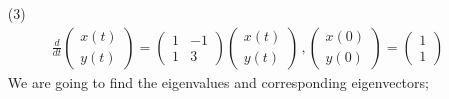 \documentclass[12pt,a4paper]{article}
\begin{document}
\begin{enumerate}
\item[(3)]
\begin{eqnarray*}
\frac{d}{dt} \begin{pmatrix}
x(t)\\
y(t) 
\end{pmatrix}= \begin{pmatrix}
1 & -1 \\
1 & 3 
\end{pmatrix} \begin{pmatrix}
x(t)\\
y(t) 
\end{pmatrix}\, , \begin{pmatrix}
x(0)\\
y(0) 
\end{pmatrix} =\begin{pmatrix}
1\\
1
\end{pmatrix}
\end{eqnarray*}
We are going to find the eigenvalues and corresponding eigenvectors;


\end{enumerate}
\end{document}
